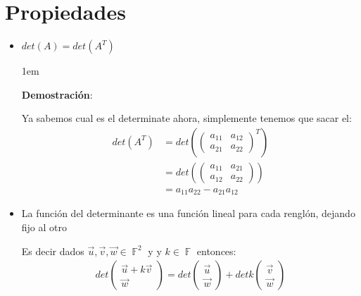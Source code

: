 \documentclass[12pt, fleqn]{report}                             %
\newenvironment{SmallIndentation}[1][0.75em]                    %
        {\begin{adjustwidth}{#1}{}\begin{footnotesize}}             %
        {\end{footnotesize}\end{adjustwidth}}                       %
\theoremstyle{break}                                            %
\DeclareMathOperator \GenericField {\mathbb{F}}                 %
\newcommand{\Wrap}[1]           {\left( #1 \right)}             %
\newcommand{\pVector}[1]                                        %
        { \ensuremath{\begin{pmatrix}#1\end{pmatrix}} }             %
\begin{document}
        \clearpage
        \section{Propiedades}

            \begin{itemize}

                \item
                    $det(A) = det(A^T)$

                    \begin{SmallIndentation}[1em]
                        \textbf{Demostración}:
                        
                        Ya sabemos cual es el determinate ahora, simplemente
                        tenemos que sacar el:
                        \begin{align*}
                            det\Wrap{A^T}
                                &= det\Wrap{\pVector{a_{11} & a_{12} \\ a_{21} & a_{22}}^T}     \\
                                &= det\Wrap{\pVector{a_{11} & a_{21} \\ a_{12} & a_{22}}}       \\
                                &= a_{11} a_{22} - a_{21} a_{12}
                        \end{align*}
                    
                    \end{SmallIndentation}
                        

                \item 
                    La función del determinante es una función lineal
                    para cada renglón, dejando fijo al otro

                    Es decir dados $\vec u, \vec v, \vec w \in \GenericField^2$ y
                    y $k \in \GenericField$ entonces:
                    \begin{align*}
                        det \pVector{\vec u + k\vec v \\ \vec w}
                            =  det \pVector{\vec u \\ \vec w}
                            + det k\pVector{\vec v \\ \vec w}
                    \end{align*}


\end{itemize}
\end{document}
